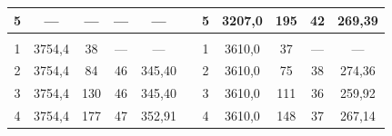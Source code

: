 \documentclass[11pt,a4paper,oneside]{article}
\begin{document}
\begin{enumerate}
\begin{center}
\begin{table}[h!]
\begin{tabular}{ccccccccccc}
\multicolumn{1}{|c|}{5}          & \multicolumn{1}{c|}{---}            & \multicolumn{1}{c|}{---}            & \multicolumn{1}{c|}{---}                     & \multicolumn{1}{c|}{---}             & \multicolumn{1}{c|}{}          & \multicolumn{1}{c|}{5}          & \multicolumn{1}{c|}{3207,0}         & \multicolumn{1}{c|}{195}            & \multicolumn{1}{c|}{42}                     & \multicolumn{1}{c|}{269,39}          \\ \hline
\multicolumn{1}{|c|}{}           & \multicolumn{1}{c|}{}               & \multicolumn{1}{c|}{}               & \multicolumn{1}{c|}{}                        & \multicolumn{1}{c|}{}                & \multicolumn{1}{c|}{}          & \multicolumn{1}{c|}{}           & \multicolumn{1}{c|}{}               & \multicolumn{1}{c|}{}               & \multicolumn{1}{c|}{}                       & \multicolumn{1}{c|}{}                \\ \hline
\multicolumn{1}{|c|}{1}          & \multicolumn{1}{c|}{3754,4}         & \multicolumn{1}{c|}{38}             & \multicolumn{1}{c|}{---}                     & \multicolumn{1}{c|}{---}             & \multicolumn{1}{c|}{}          & \multicolumn{1}{c|}{1}          & \multicolumn{1}{c|}{3610,0}         & \multicolumn{1}{c|}{37}             & \multicolumn{1}{c|}{---}                    & \multicolumn{1}{c|}{---}             \\ \hline
\multicolumn{1}{|c|}{2}          & \multicolumn{1}{c|}{3754,4}         & \multicolumn{1}{c|}{84}             & \multicolumn{1}{c|}{46}                      & \multicolumn{1}{c|}{345,40}          & \multicolumn{1}{c|}{}          & \multicolumn{1}{c|}{2}          & \multicolumn{1}{c|}{3610,0}         & \multicolumn{1}{c|}{75}             & \multicolumn{1}{c|}{38}                     & \multicolumn{1}{c|}{274,36}          \\ \hline
\multicolumn{1}{|c|}{3}          & \multicolumn{1}{c|}{3754,4}         & \multicolumn{1}{c|}{130}            & \multicolumn{1}{c|}{46}                      & \multicolumn{1}{c|}{345,40}          & \multicolumn{1}{c|}{}          & \multicolumn{1}{c|}{3}          & \multicolumn{1}{c|}{3610,0}         & \multicolumn{1}{c|}{111}            & \multicolumn{1}{c|}{36}                     & \multicolumn{1}{c|}{259,92}          \\ \hline
\multicolumn{1}{|c|}{4}          & \multicolumn{1}{c|}{3754,4}         & \multicolumn{1}{c|}{177}            & \multicolumn{1}{c|}{47}                      & \multicolumn{1}{c|}{352,91}          & \multicolumn{1}{c|}{}          & \multicolumn{1}{c|}{4}          & \multicolumn{1}{c|}{3610,0}         & \multicolumn{1}{c|}{148}            & \multicolumn{1}{c|}{37}                     & \multicolumn{1}{c|}{267,14}          \\ \hline

\end{tabular}
\end{table}
\end{center}
\end{enumerate}
\end{document}
